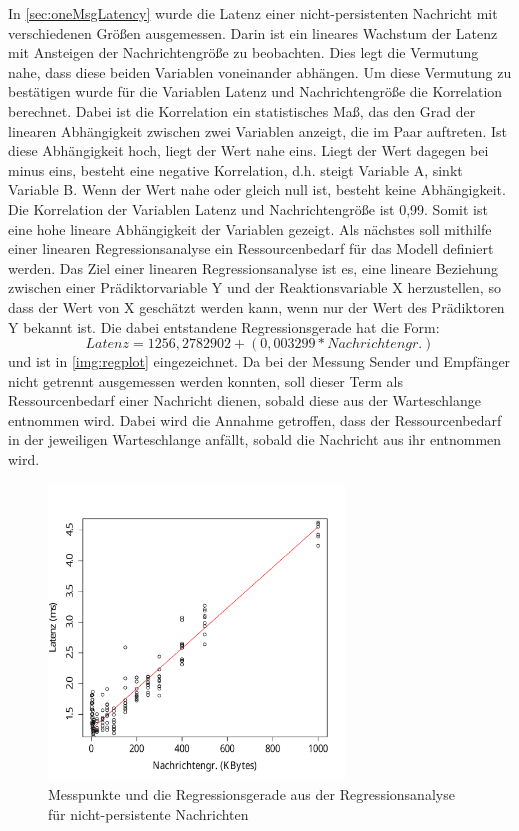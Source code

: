 In \autoref{sec:oneMsgLatency} wurde die Latenz einer nicht-persistenten Nachricht mit verschiedenen Größen ausgemessen. Darin ist ein lineares Wachstum der Latenz mit Ansteigen der Nachrichtengröße zu beobachten. Dies legt die Vermutung nahe, dass diese beiden Variablen voneinander abhängen. Um diese Vermutung zu bestätigen wurde für die Variablen Latenz und Nachrichtengröße die Korrelation berechnet. Dabei ist die Korrelation ein statistisches Maß, das den Grad der linearen Abhängigkeit zwischen zwei Variablen anzeigt, die im Paar auftreten. Ist diese Abhängigkeit hoch, liegt der Wert nahe eins. Liegt der Wert dagegen bei minus eins, besteht eine negative Korrelation, d.h. steigt Variable A, sinkt Variable B. Wenn der Wert nahe oder gleich null ist, besteht keine Abhängigkeit. Die Korrelation der Variablen Latenz und Nachrichtengröße ist 0,99. Somit ist eine hohe lineare Abhängigkeit der Variablen gezeigt. Als nächstes soll mithilfe einer linearen Regressionsanalyse ein Ressourcenbedarf für das Modell definiert werden. Das Ziel einer linearen Regressionsanalyse ist es, eine lineare Beziehung zwischen einer Prädiktorvariable Y und der Reaktionsvariable X herzustellen, so dass der Wert von X geschätzt werden kann, wenn nur der Wert des Prädiktoren Y bekannt ist. Die dabei entstandene Regressionsgerade hat die Form: \[Latenz = 1256,2782902 + (0,003299 * Nachrichtengr.)\] und ist in \autoref{img:regplot} eingezeichnet. Da bei der Messung Sender und Empfänger nicht getrennt ausgemessen werden konnten, soll dieser Term als Ressourcenbedarf einer Nachricht dienen, sobald diese aus der Warteschlange entnommen wird. Dabei wird die Annahme getroffen, dass der Ressourcenbedarf in der jeweiligen Warteschlange anfällt, sobald die Nachricht aus ihr entnommen wird. 
\begin{figure}
\center
  \includegraphics[width=0.7\textwidth]{images/modelling/oneMsgRegression.pdf}
  \caption{Messpunkte und die Regressionsgerade aus der Regressionsanalyse für nicht-persistente Nachrichten}
  \label{img:regplot}
\end{figure}

